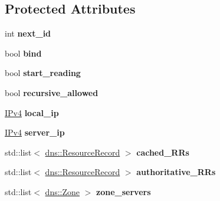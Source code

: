 \subsection*{Protected Attributes}
\begin{DoxyCompactItemize}
\item 
int {\bfseries next\+\_\+id}\hypertarget{classdns__server_a2da2838d3660ae78cba549d9acb899e7}{}\label{classdns__server_a2da2838d3660ae78cba549d9acb899e7}

\item 
bool {\bfseries bind}\hypertarget{classdns__server_aa593f877363212c866ffa1fe59a06435}{}\label{classdns__server_aa593f877363212c866ffa1fe59a06435}

\item 
bool {\bfseries start\+\_\+reading}\hypertarget{classdns__server_a9245a53bf6cd3a03fe38b5ef1c08cd1a}{}\label{classdns__server_a9245a53bf6cd3a03fe38b5ef1c08cd1a}

\item 
bool {\bfseries recursive\+\_\+allowed}\hypertarget{classdns__server_a754e1a5b9cc9f5831724d3209fa101e7}{}\label{classdns__server_a754e1a5b9cc9f5831724d3209fa101e7}

\item 
\hyperlink{structIPv4}{I\+Pv4} {\bfseries local\+\_\+ip}\hypertarget{classdns__server_a3b185eef3b7d44822d0a9a12baeb71ee}{}\label{classdns__server_a3b185eef3b7d44822d0a9a12baeb71ee}

\item 
\hyperlink{structIPv4}{I\+Pv4} {\bfseries server\+\_\+ip}\hypertarget{classdns__server_af587511dc4a23c264e30502506746c9a}{}\label{classdns__server_af587511dc4a23c264e30502506746c9a}

\item 
std\+::list$<$ \hyperlink{structdns_1_1ResourceRecord}{dns\+::\+Resource\+Record} $>$ {\bfseries cached\+\_\+\+R\+Rs}\hypertarget{classdns__server_a9708a2ed7f8735caaf541b1fde6ee15d}{}\label{classdns__server_a9708a2ed7f8735caaf541b1fde6ee15d}

\item 
std\+::list$<$ \hyperlink{structdns_1_1ResourceRecord}{dns\+::\+Resource\+Record} $>$ {\bfseries authoritative\+\_\+\+R\+Rs}\hypertarget{classdns__server_aafed2cfadd1263403cf6147981ca503b}{}\label{classdns__server_aafed2cfadd1263403cf6147981ca503b}

\item 
std\+::list$<$ \hyperlink{structdns_1_1Zone}{dns\+::\+Zone} $>$ {\bfseries zone\+\_\+servers}\hypertarget{classdns__server_a4e467dbf292e6f8e15b28fe93c4969fb}{}\label{classdns__server_a4e467dbf292e6f8e15b28fe93c4969fb}


\end{DoxyCompactItemize}
